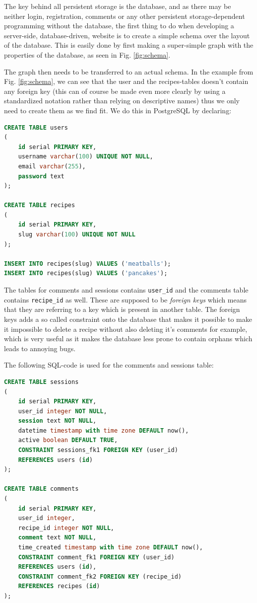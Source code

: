 \documentclass[a4paper]{scrartcl}
\begin{document}
The key behind all persistent storage is the database, and as there may be neither login, registration, comments or any other persistent storage-dependent programming without the database, the first thing to do when developing a server-side, database-driven, website is to create a simple schema over the layout of the database. This is easily done by first making a super-simple graph with the properties of the database, as seen in Fig. \ref{fig:schema}.

The graph then needs to be transferred to an actual schema. In the example from Fig. \ref{fig:schema}, we can see that the user and the recipes-tables doesn't contain any foreign key (this can of course be made even more clearly by using a standardized notation rather than relying on descriptive names) thus we only need to create them as we find fit. We do this in PostgreSQL by declaring:

\begin{lstlisting}[language=SQL]
CREATE TABLE users
(
	id serial PRIMARY KEY,
	username varchar(100) UNIQUE NOT NULL,
	email varchar(255),
	password text
);

CREATE TABLE recipes
(
	id serial PRIMARY KEY,
	slug varchar(100) UNIQUE NOT NULL
);

INSERT INTO recipes(slug) VALUES ('meatballs');
INSERT INTO recipes(slug) VALUES ('pancakes');
\end{lstlisting}

The tables for comments and sessions contains \texttt{user\_id} and the comments table contains \texttt{recipe\_id} as well. These are supposed to be \emph{foreign keys} which means that they are referring to a key which is present in another table. The foreign keys adds a so called constraint onto the database that makes it possible to make it impossible to delete a recipe without also deleting it's comments for example, which is very useful as it makes the database less prone to contain orphans which leads to annoying bugs.

The following SQL-code is used for the comments and sessions table:
\begin{lstlisting}[language=SQL]
CREATE TABLE sessions
(
	id serial PRIMARY KEY,
	user_id integer NOT NULL,
	session text NOT NULL,
	datetime timestamp with time zone DEFAULT now(),
	active boolean DEFAULT TRUE,
	CONSTRAINT sessions_fk1 FOREIGN KEY (user_id)
	REFERENCES users (id)
);

CREATE TABLE comments
(
	id serial PRIMARY KEY,
	user_id integer,
	recipe_id integer NOT NULL,
	comment text NOT NULL,
	time_created timestamp with time zone DEFAULT now(),
	CONSTRAINT comment_fk1 FOREIGN KEY (user_id)
	REFERENCES users (id),
	CONSTRAINT comment_fk2 FOREIGN KEY (recipe_id)
	REFERENCES recipes (id)
);
\end{lstlisting}
\end{document}
